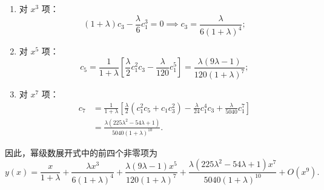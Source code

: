 \begin{solution}
\begin{enumerate}
              \begin{equation}
                  (1 + \lambda)c_1 = 1
                  \implies c_1 = \frac{1}{1 + \lambda};
              \end{equation}
        \item 对 $x^3$ 项：
              \begin{equation}
                  (1 + \lambda)c_3 - \frac{\lambda}{6}c_1^3 = 0
                  \implies c_3 = \frac{\lambda}{6(1 + \lambda)^4};
              \end{equation}
        \item 对 $x^5$ 项：
              \begin{equation}
                  c_5 = \frac{1}{1 + \lambda}
                  \left[\frac{\lambda}{2}c_1^2c_3
                      - \frac{\lambda}{120}c_1^5\right]
                  = \frac{\lambda(9\lambda - 1)}
                  {120(1 + \lambda)^7};
              \end{equation}
        \item 对 $x^7$ 项：
              \begin{equation}
                  \begin{aligned}
                      c_7
                       & = \frac{1}{1 + \lambda}
                      \left[
                          \frac{\lambda}{2}\left(c_1^2c_5 + c_1c_3^2\right)
                          - \frac{\lambda}{24}c_1^4c_3
                          + \frac{\lambda}{5040}c_1^7
                          \right] \\
                       & = \frac{\lambda(225\lambda^2 - 54\lambda + 1)}
                           {5040(1 + \lambda)^{10}}.
                  \end{aligned}
              \end{equation}
    \end{enumerate}
    因此，幂级数展开式中的前四个非零项为
    \begin{equation}
        \boxed{
            y(x)
            = \frac{x}{1 + \lambda}
            + \frac{\lambda x^3}{6(1 + \lambda)^4}
            + \frac{\lambda(9\lambda - 1)x^5}{120(1 + \lambda)^7}
            + \frac{\lambda(225\lambda^2 - 54\lambda + 1)x^7}
            {5040(1 + \lambda)^{10}}
            + O(x^9).
        }
    \end{equation}
\end{solution}

\endinput
